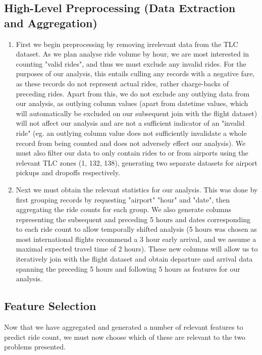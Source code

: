 \documentclass[11pt]{article}
\begin{document}
\subsection{High-Level Preprocessing (Data Extraction and Aggregation)}
\begin{enumerate} 
    \item First we begin preprocessing by removing irrelevant data from the TLC dataset. As we plan analyse ride volume by hour, we are most interested in counting "valid rides", and thus we must exclude any invalid rides. For the purposes of our analysis, this entails culling any records with a negative fare, as these records do not represent actual rides, rather charge-backs of preceding rides. Apart from this, we do not exclude any outlying data from our analysis, as outlying column values (apart from datetime values, which will automatically be excluded on our subsequent join with the flight dataset) will not affect our analysis and are not a sufficient indicator of an "invalid ride" (eg. an outlying column value does not sufficiently invalidate a whole record from being counted and does not adversely effect our analysis). We must also filter our data to only contain rides to or from airports using the relevant TLC zones (1, 132, 138), generating two separate datasets for airport pickups and dropoffs respectively.
    \item Next we must obtain the relevant statistics for our analysis. This was done by first grouping records by requesting "airport" "hour" and "date", then aggregating the ride counts for each group. We also generate columns representing the subsequent and preceding 5 hours and dates corresponding to each ride count to allow temporally shifted analysis (5 hours was chosen as most international flights recommend a 3 hour early arrival, and we assume a maximal expected travel time of 2 hours). These new columns will allow us to iteratively join with the flight dataset and obtain departure and arrival data spanning the preceding 5 hours and following 5 hours as features for our analysis. 
\end{enumerate}
\subsection{Feature Selection}
Now that we have aggregated and generated a number of relevant features to predict ride count, we must now choose which of these are relevant to the two problems presented.
\end{document}
